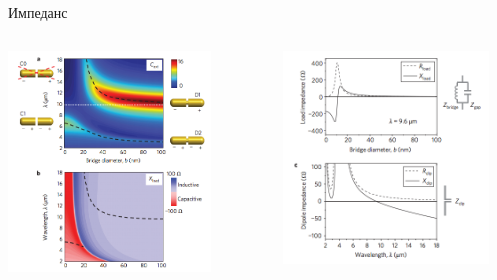 \documentclass[9pt, compress, xcolor=table]{beamer}
\begin{document}
\begin{frame}{Импеданс}
\begin{columns}[c]
\column{6.5cm}
\begin{center}
\includegraphics[width=0.8\textwidth]{optant76}
\end{center}
\column{6cm}
\begin{center}
\includegraphics[width=0.9\textwidth]{optant77}
\end{center}
\end{columns}


\end{frame}
\end{document}
